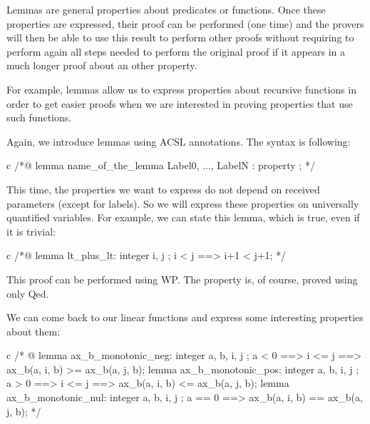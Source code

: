 Lemmas are general properties about predicates or functions. Once these
properties are expressed, their proof can be performed (one time) and
the provers will then be able to use this result to perform other proofs
without requiring to perform again all steps needed to perform the
original proof if it appears in a much longer proof about an other
property.




For example, lemmas allow us to express properties about recursive
functions in order to get easier proofs when we are interested in
proving properties that use such functions.





Again, we introduce lemmas using ACSL annotations. The syntax is
following:



\begin{CodeBlock}{c}
/*@
  lemma name_of_the_lemma { Label0, ..., LabelN }:
    property ;
*/
\end{CodeBlock}



This time, the properties we want to express do not depend on received
parameters (except for labels). So we will express these properties on
universally quantified variables. For example, we can state this lemma,
which is true, even if it is trivial:



\begin{CodeBlock}{c}
/*@
  lemma lt_plus_lt:
    \forall integer i, j ; i < j ==> i+1 < j+1;
*/
\end{CodeBlock}



This proof can be performed using WP. The property is, of course, proved
using only Qed.





We can come back to our linear functions and express some interesting
properties about them:



\begin{CodeBlock}{c}
/* @
  lemma ax_b_monotonic_neg:
    \forall integer a, b, i, j ;
      a <  0 ==> i <= j ==> ax_b(a, i, b) >= ax_b(a, j, b);
  lemma ax_b_monotonic_pos:
    \forall integer a, b, i, j ;
      a >  0 ==> i <= j ==> ax_b(a, i, b) <= ax_b(a, j, b);
  lemma ax_b_monotonic_nul:
    \forall integer a, b, i, j ;
      a == 0 ==> ax_b(a, i, b) == ax_b(a, j, b);
*/
\end{CodeBlock}




